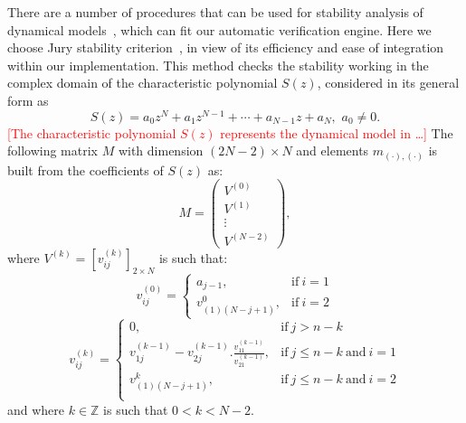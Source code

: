\documentclass[twocolumn]{autart}    %
\renewcommand{\note}[1]{\textcolor{red}{[#1]}}
\begin{document}
There are a number of procedures that can be used for stability analysis of dynamical models~\cite{daes20161, Bessa16}, 
which can fit our automatic verification engine.  
Here we choose Jury stability criterion~\cite{astrom1997computer}, 
in view of its efficiency and ease of integration within our implementation.  
This method checks the stability working in the complex domain of the characteristic polynomial $S(z)$,  
%
%
considered in its general form as 
%
\begin{equation*}
S(z) = a_0z^N+a_1z^{N-1}+\cdots+a_{N-1}z+a_N,\,\, a_0\neq0. 
\end{equation*}
\note{The characteristic polynomial $S(z)$ represents the dynamical model in \ldots }
The following matrix $M$ with dimension $(2N-2)\times N$ and elements $m_{(\cdot),(\cdot)}$ is built from the coefficients of $S(z)$ as:  
%
$$
M=\left( 
\begin{array}{c}
V^{(0)}\\
V^{(1)}\\
\vdots\\
V^{(N-2)}
\end{array}
\right), 
$$
%
where $V^{(k)} = [v^{(k)}_{ij} ]_{2\times N}$ is such that:
%
$$
v_{ij}^{(0)}=\left\{
\begin{array}{ll}
a_{j-1}, & \mbox{if}~i=1\\
v_{(1)(N-j+1)}^{0},&\mbox{if}~i=2
\end{array}
\right.
$$
%
$$
v_{ij}^{(k)}=\left\{
\begin{array}{ll}
0,&\mbox{if}~j>n-k\\
v_{1j}^{(k-1)}-v_{2j}^{(k-1)} . \frac{v_{11}^{(k-1)}}{v_{21}^{(k-1)}}, & \mbox{if}~j\leq n-k ~\mbox{and}~i=1\\
v_{(1)(N-j+1)}^{k},& \mbox{if}~j\leq n-k ~\mbox{and}~i=2\\
\end{array}
\right.
$$
%
and where $k \in \mathbb{Z}$ is such that $0 < k < N - 2$.  
\end{document}
